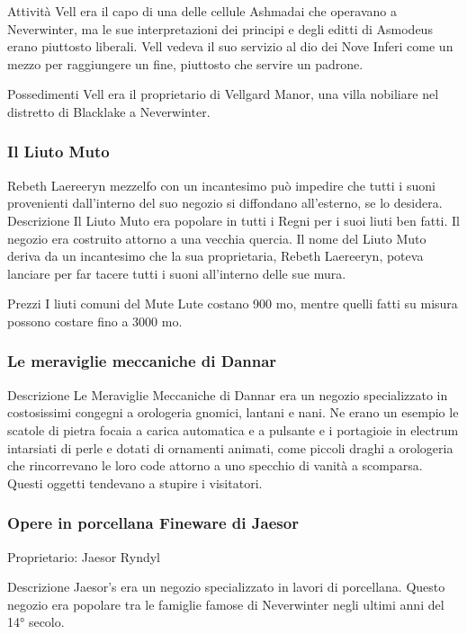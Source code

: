 \documentclass{article}
\begin{document}
Attività
Vell era il capo di una delle cellule Ashmadai che operavano a Neverwinter, ma le sue interpretazioni dei principi e degli editti di Asmodeus erano piuttosto liberali. Vell vedeva il suo servizio al dio dei Nove Inferi come un mezzo per raggiungere un fine, piuttosto che servire un padrone.

Possedimenti
Vell era il proprietario di Vellgard Manor, una villa nobiliare nel distretto di Blacklake a Neverwinter.

              \subsubsection{Il Liuto Muto}
Rebeth Laereeryn mezzelfo
con un incantesimo può impedire che tutti i suoni provenienti dall'interno del suo negozio si diffondano all'esterno, se lo desidera.
Descrizione
Il Liuto Muto era popolare in tutti i Regni per i suoi liuti ben fatti. Il negozio era costruito attorno a una vecchia quercia. Il nome del Liuto Muto deriva da un incantesimo che la sua proprietaria, Rebeth Laereeryn, poteva lanciare per far tacere tutti i suoni all'interno delle sue mura.

Prezzi
I liuti comuni del Mute Lute costano 900 mo, mentre quelli fatti su misura possono costare fino a 3000 mo.

              \subsubsection{Le meraviglie meccaniche di Dannar}
Descrizione
Le Meraviglie Meccaniche di Dannar era un negozio specializzato in costosissimi congegni a orologeria gnomici, lantani e nani. Ne erano un esempio le scatole di pietra focaia a carica automatica e a pulsante e i portagioie in electrum intarsiati di perle e dotati di ornamenti animati, come piccoli draghi a orologeria che rincorrevano le loro code attorno a uno specchio di vanità a scomparsa. Questi oggetti tendevano a stupire i visitatori.


              \subsubsection{Opere in porcellana Fineware di Jaesor}

Proprietario: Jaesor Ryndyl

Descrizione
Jaesor's era un negozio specializzato in lavori di porcellana. Questo negozio era popolare tra le famiglie famose di Neverwinter negli ultimi anni del 14° secolo.
\end{document}
